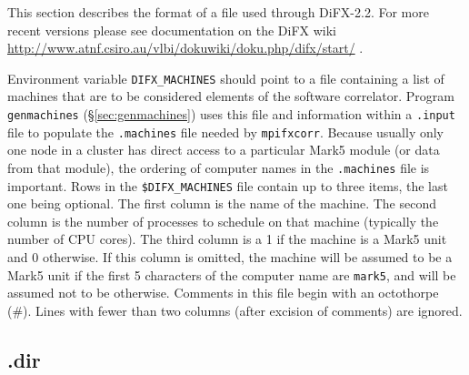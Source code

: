 This section describes the format of a file used through DiFX-2.2.
For more recent versions please see documentation on the DiFX wiki \url{http://www.atnf.csiro.au/vlbi/dokuwiki/doku.php/difx/start/} .

Environment variable {\tt DIFX\_MACHINES} should point to a file containing a list of machines that are to be considered elements of the software correlator.
Program {\tt genmachines} (\S\ref{sec:genmachines}) uses this file and information within a {\tt .input} file to populate the {\tt .machines} file needed by {\tt mpifxcorr}.
Because usually only one node in a cluster has direct access to a particular Mark5 module (or data from that module), the ordering of computer names in the {\tt .machines} file is important.
Rows in the {\tt \$DIFX\_MACHINES} file contain up to three items, the last one being optional.
The first column is the name of the machine.
The second column is the number of processes to schedule on that machine (typically the number of CPU cores).
The third column is a 1 if the machine is a Mark5 unit and 0 otherwise.
If this column is omitted, the machine will be assumed to be a Mark5 unit if the first 5 characters of the computer name are {\tt mark5}, and will be assumed not to be otherwise.
Comments in this file begin with an octothorpe (\#).
Lines with fewer than two columns (after excision of comments) are ignored.








\subsection{.dir} \label{sec:dir}

